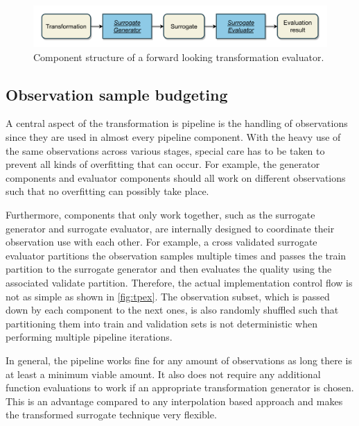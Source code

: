 \documentclass[
  a4paper,  %
  twoside,  %
  bibliography=totoc,
  headsepline,
  cleardoublepage=empty,
  parskip=half,
  draft=false
]{scrbook}
\begin{document}
\begin{mdframed}[style=style,frametitle={Transformation evaluator (forward looking)}]
\begin{figure}[H]
\includegraphics[width=\textwidth]{graphics/TransformationEval.pdf}
\delimit
\caption{Component structure of a forward looking transformation evaluator.}
\label{fig:te}
\end{figure}
\end{mdframed}


\subsection{Observation sample budgeting}

A central aspect of the transformation is pipeline is the handling of observations since they are used in almost every pipeline component.
With the heavy use of the same observations across various stages, special care has to be taken to prevent all kinds of overfitting that can occur.
For example, the generator components and evaluator components should all work on different observations such that no overfitting can possibly take place.

Furthermore, components that only work together, such as the surrogate generator and surrogate evaluator, are internally designed to coordinate their observation use with each other.
For example, a cross validated surrogate evaluator partitions the observation samples multiple times and passes the train partition to the surrogate generator and then evaluates the quality using the associated validate partition.
Therefore, the actual implementation control flow is not as simple as shown in \cref{fig:tpex}.
The observation subset, which is passed down by each component to the next ones, is also randomly shuffled such that partitioning them into train and validation sets is not deterministic when performing multiple pipeline iterations.

In general, the pipeline works fine for any amount of observations as long there is at least a minimum viable amount.
It also does not require any additional function evaluations to work if an appropriate transformation generator is chosen.
This is an advantage compared to any interpolation based approach and makes the transformed surrogate technique very flexible.
\end{document}
